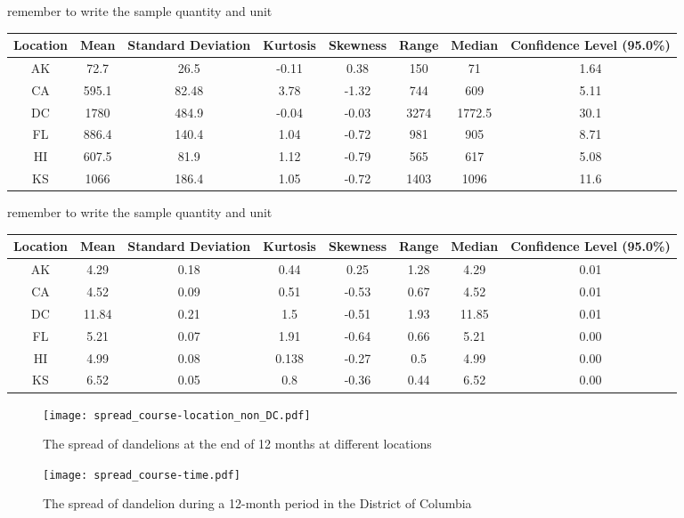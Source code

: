\documentclass[12pt]{article}
\begin{document}
			remember to write the sample quantity and unit \\
			
			{
				\fontsize{10}{14}\selectfont
				{
					\begin{longtable}{cccccccc}
						\toprule
						Location&Mean&Standard Deviation&Kurtosis&Skewness&Range&Median&Confidence Level (95.0\%)\\
						\toprule
						AK&72.7&26.5&-0.11&0.38&150&71&1.64\\
						CA&595.1&82.48&3.78&-1.32&744&609&5.11\\
						DC&1780&484.9&-0.04&-0.03&3274&1772.5&30.1\\
						FL&886.4&140.4&1.04&-0.72&981&905&8.71\\
						HI&607.5&81.9&1.12&-0.79&565&617&5.08\\
						KS&1066&186.4&1.05&-0.72&1403&1096&11.6\\
						\bottomrule
					\end{longtable}
				}
			}
			
			remember to write the sample quantity and unit \\
			
			{
				\fontsize{10}{14}\selectfont
				{
					\begin{longtable}{cccccccc}
						\toprule
						Location&Mean&Standard Deviation&Kurtosis&Skewness&Range&Median&Confidence Level (95.0\%)\\
						\toprule
						AK&4.29&0.18&0.44&0.25&1.28&4.29&0.01\\
						CA&4.52&0.09&0.51&-0.53&0.67&4.52&0.01\\
						DC&11.84&0.21&1.5&-0.51&1.93&11.85&0.01\\
						FL&5.21&0.07&1.91&-0.64&0.66&5.21&0.00\\
						HI&4.99&0.08&0.138&-0.27&0.5&4.99&0.00\\
						KS&6.52&0.05&0.8&-0.36&0.44&6.52&0.00\\
						\bottomrule
					\end{longtable}
				}
			}
			
			\begin{figure}
				\centering
				\texttt{[image: spread\_course-location\_non\_DC.pdf]}
				\caption{The spread of dandelions at the end of 12 months at different locations}
				\label{fig:scatter5loc}
			\end{figure}
					
			\begin{figure}
				\centering
				\texttt{[image: spread\_course-time.pdf]}
				\caption{The spread of dandelion during a 12-month period in the District of Columbia}
				\label{fig:spreadDC}
			\end{figure}
					
\end{document}
